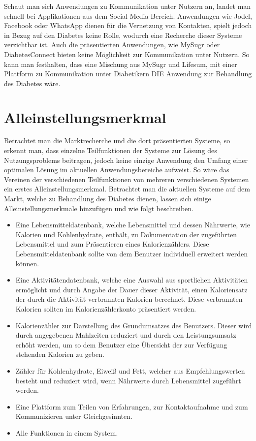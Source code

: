 \documentclass[a4paper,11pt]{article}%
\renewcommand{\\}{\vspace*{0.5\baselineskip} \newline}
\begin{document}
	Schaut man sich Anwendungen zu Kommunikation unter Nutzern an, landet man schnell bei Applikationen aus dem Social Media-Bereich. Anwendungen wie Jodel, Facebook oder WhatsApp dienen für die Vernetzung von Kontakten, spielt jedoch in Bezug auf den Diabetes keine Rolle, wodurch eine Recherche dieser Systeme verzichtbar ist. Auch die präsentierten Anwendungen, wie MySugr oder DiabetesConnect bieten keine Möglichkeit zur Kommunikation unter Nutzern. \newline
	So kann man festhalten, dass eine Mischung aus MySugr und Lifesum, mit einer Plattform zu Kommunikation unter Diabetikern DIE Anwendung zur Behandlung des Diabetes wäre.
\newpage

\section{Alleinstellungsmerkmal}
	Betrachtet man die Marktrecherche und die dort präsentierten Systeme, so erkennt man, dass einzelne Teilfunktionen  der Systeme zur Lösung des Nutzungsproblems beitragen, jedoch keine einzige Anwendung den Umfang einer optimalen Lösung im aktuellen Anwendungsbereiche aufweist. So wäre das Vereinen der verschiedenen Teilfunktionen von mehreren verschiedenen Systemen ein erstes Alleinstellungsmerkmal. Betrachtet man die aktuellen Systeme auf dem Markt, welche zu Behandlung des Diabetes dienen, lassen sich einige Alleinstellungsmerkmale hinzufügen und wie folgt beschreiben.
	\begin{itemize}
	\item Eine Lebensmitteldatenbank, welche Lebensmittel und dessen Nährwerte, wie Kalorien und Kohlenhydrate, enthält, zu Dokumentation der zugeführten Lebensmittel und zum Präsentieren eines Kalorienzählers. Diese Lebensmitteldatenbank sollte von dem Benutzer individuell erweitert werden können.
	\item Eine Aktivitätendatenbank, welche eine Auswahl aus sportlichen Aktivitäten ermöglicht und durch Angabe der Dauer dieser Aktivität, einen Kaloriensatz der durch die Aktivität verbrannten Kalorien berechnet. Diese verbrannten Kalorien sollten im Kalorienzählerkonto präsentiert werden.
	\item Kalorienzähler zur Darstellung des Grundumsatzes des Benutzers. Dieser wird durch angegebenen Mahlzeiten reduziert und durch den Leistungsumsatz erhöht werden, um so dem Benutzer eine Übersicht der zur Verfügung stehenden Kalorien zu geben.
	\item Zähler für Kohlenhydrate, Eiweiß und Fett, welcher aus Empfehlungswerten besteht und reduziert wird, wenn Nährwerte durch Lebensmittel zugeführt werden.
	\item Eine Plattform zum Teilen von Erfahrungen, zur Kontaktaufnahme und zum Kommunizieren unter Gleichgesinnten. 
	\item Alle Funktionen in einem System.
	\end{itemize}
\end{document}
